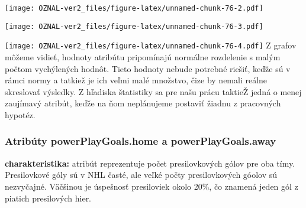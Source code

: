 \documentclass[
]{article}
\newenvironment{Shaded}{\begin{snugshade}}{\end{snugshade}}
\newcommand{\AttributeTok}[1]{\textcolor[rgb]{0.77,0.63,0.00}{#1}}
\newcommand{\FunctionTok}[1]{\textcolor[rgb]{0.00,0.00,0.00}{#1}}
\newcommand{\NormalTok}[1]{#1}
\newcommand{\SpecialCharTok}[1]{\textcolor[rgb]{0.00,0.00,0.00}{#1}}
\newcommand{\StringTok}[1]{\textcolor[rgb]{0.31,0.60,0.02}{#1}}
\begin{document}
\texttt{[image: OZNAL-ver2\_files/figure-latex/unnamed-chunk-76-2.pdf]}

\begin{Shaded}
\end{Shaded}

\texttt{[image: OZNAL-ver2\_files/figure-latex/unnamed-chunk-76-3.pdf]}

\begin{Shaded}
\end{Shaded}

\texttt{[image: OZNAL-ver2\_files/figure-latex/unnamed-chunk-76-4.pdf]} Z
grafov môžeme vidieť, hodnoty atribútu pripomínajú normálne rozdelenie s
malým počtom vychýlených hodnôt. Tieto hodnoty nebude potrebné riešiť,
keďže sú v rámci normy a tatkiež je ich veľmi malé množstvo, čize by
nemali reálne skreslovať výsledky. Z hľadiska štatistiky sa pre našu
prácu taktieŽ jedná o menej zaujímavý atribút, keďže na ňom neplánujeme
postaviť žiadnu z pracovných hypotéz.

\hypertarget{atribuxfaty-powerplaygoals.home-a-powerplaygoals.away}{%
\subsubsection{Atribúty powerPlayGoals.home a
powerPlayGoals.away}\label{atribuxfaty-powerplaygoals.home-a-powerplaygoals.away}}

\textbf{charakteristika:} atribút reprezentuje počet presilovkových
gólov pre oba tímy. Presilovkové góly sú v NHL časté, ale veľké počty
presilovkových góolov sú nezvyčajné. Väčšinou je úspešnosť presiloviek
okolo 20\%, čo znamená jeden gól z piatich presilových hier.

\begin{Shaded}
\end{Shaded}
\end{document}
